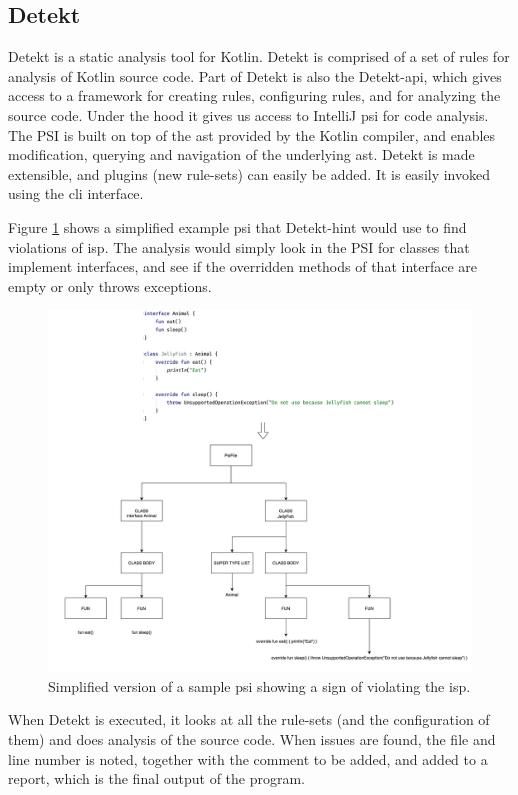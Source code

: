 \documentclass[pdftex,10pt,b5paper,twoside]{report}
\begin{document}
\subsection{Detekt}
Detekt is a static analysis tool for Kotlin. Detekt is comprised of a set of rules for analysis of Kotlin source code. Part of Detekt is also the Detekt-api, which gives access to a framework for creating rules, configuring rules, and for analyzing the source code. Under the hood it gives us access to IntelliJ \gls{psi} for code analysis. The PSI is built on top of the \gls{ast} provided by the Kotlin compiler, and enables modification, querying and navigation of the underlying \gls{ast}. Detekt is made extensible, and plugins (new rule-sets) can easily be added. It is easily invoked using the \gls{cli} interface.

Figure \ref{fig:psi} shows a simplified example \gls{psi} that Detekt-hint would use to find violations of \gls{isp}. The analysis would simply look in the PSI for classes that implement interfaces, and see if the overridden methods of that interface are empty or only throws exceptions. 

\begin{figure}[h!]
    \centering
    \includegraphics[width=\linewidth]{report/images/psi.png}
    \caption{Simplified version of a sample \gls{psi} showing a sign of violating the \gls{isp}.}
    \label{fig:psi}
\end{figure}

When Detekt is executed, it looks at all the rule-sets (and the configuration of them) and does analysis of the source code. When issues are found, the file and line number is noted, together with the comment to be added, and added to a report, which is the final output of the program. 
\end{document}
